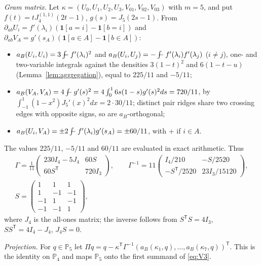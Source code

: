 \documentclass[11pt,a4paper]{article}
\theoremstyle{definition}
\theoremstyle{remark}
\newcommand{\avg}{\mathop{\mathchoice{{\textstyle\int}\mkern-15.5mu{-}\mkern2mu}{\int\mkern-12mu{-}\mkern1mu}{\int\mkern-11mu{-}}{\int\mkern-11mu{-}}}\nolimits}
\newcommand{\Pol}{\mathbb P}
\newcommand{\J}{J}
\begin{document}
\emph{Gram matrix.} Let
\(\kappa=(U_0,U_1,U_2,U_3,V_{01},V_{02},V_{03})\) with \(m=5\), and put
\(f(t)=t\J_4^{(1,1)}(2t-1)\), \(g(s)=\J_5(2s-1)\). From
\(\partial_{ab}U_i=f'(\lambda_i)(\mathbf 1[a=i]-\mathbf 1[b=i])\) and
\(\partial_{ab}V_A=g'(s_A)(\mathbf 1[a\in A]-\mathbf 1[b\in A])\):
\begin{itemize}
\item \(a_B(U_i,U_i)=3\avg f'(\lambda_i)^2\) and
 \(a_B(U_i,U_j)=-\avg f'(\lambda_i)f'(\lambda_j)\) (\(i\ne j\)), one-
 and two-variable integrals against the densities \(3(1-t)^2\) and
 \(6(1-t-u)\) (Lemma~\ref{lem:aggregation}), equal to \(225/11\) and
 \(-5/11\);
\item \(a_B(V_A,V_A)=4\avg g'(s)^2=4\int_0^16s(1-s)g'(s)^2ds=720/11\),
 by \(\int_{-1}^1(1-x^2)\J_5'(x)^2dx=2\cdot30/11\); distinct pair ridges
 share two crossing edges with opposite signs, so are \(a_B\)-orthogonal;
\item \(a_B(U_i,V_A)=\pm2\avg f'(\lambda_i)g'(s_A)=\pm60/11\), with \(+\)
 if \(i\in A\).
\end{itemize}
The values \(225/11\), \(-5/11\) and \(60/11\) are evaluated in exact
arithmetic. Thus
\begin{equation}
\begin{gathered}
 \Gamma=\frac1{11}\begin{pmatrix}230I_4-5J_4&60S\\60S^{\mathsf T}&720I_3\end{pmatrix},
 \qquad
 \Gamma^{-1}=11\begin{pmatrix}I_4/210&-S/2520\\-S^{\mathsf T}/2520&23I_3/15120\end{pmatrix},
 \\
 S=\begin{pmatrix}1&1&1\\1&-1&-1\\-1&1&-1\\-1&-1&1\end{pmatrix},
\end{gathered}
 \label{eq:gram}
\end{equation}
where \(J_4\) is the all-ones matrix; the inverse follows from
\(S^{\mathsf T}S=4I_3\), \(SS^{\mathsf T}=4I_4-J_4\), \(J_4S=0\).

\emph{Projection.} For \(q\in\Pol_5\) let
\(\Pi q=q-\kappa^{\mathsf T}\Gamma^{-1}(a_B(\kappa_1,q),\dots,a_B(\kappa_7,q))^{\mathsf T}\).
This is the identity on \(\Pol_4\) and maps \(\Pol_5\) onto the first summand
of \eqref{eq:V3}.
\end{document}
